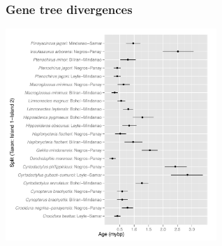 \begin{frame}[noframenumbering]
    \frametitle{Gene tree divergences}
    \centerline{
    \includegraphics[height=8cm]{images/gene_splits.pdf}}
\end{frame}



